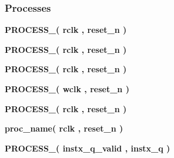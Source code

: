 \subsubsection*{Processes}
 \begin{DoxyCompactItemize}
\item 
{\bf P\+R\+O\+C\+E\+S\+S\+\_}{\bfseries  ( {\bfseries {\bfseries {\bf rclk}} \textcolor{vhdlchar}{ }} , {\bfseries {\bfseries {\bf reset\+\_\+n}} \textcolor{vhdlchar}{ }} )}
\item 
{\bf P\+R\+O\+C\+E\+S\+S\+\_}{\bfseries  ( {\bfseries {\bfseries {\bf rclk}} \textcolor{vhdlchar}{ }} , {\bfseries {\bfseries {\bf reset\+\_\+n}} \textcolor{vhdlchar}{ }} )}
\item 
{\bf P\+R\+O\+C\+E\+S\+S\+\_}{\bfseries  ( {\bfseries {\bfseries {\bf rclk}} \textcolor{vhdlchar}{ }} , {\bfseries {\bfseries {\bf reset\+\_\+n}} \textcolor{vhdlchar}{ }} )}
\item 
{\bf P\+R\+O\+C\+E\+S\+S\+\_}{\bfseries  ( {\bfseries {\bfseries {\bf wclk}} \textcolor{vhdlchar}{ }} , {\bfseries {\bfseries {\bf reset\+\_\+n}} \textcolor{vhdlchar}{ }} )}
\item 
{\bf P\+R\+O\+C\+E\+S\+S\+\_}{\bfseries  ( {\bfseries {\bfseries {\bf rclk}} \textcolor{vhdlchar}{ }} , {\bfseries {\bfseries {\bf reset\+\_\+n}} \textcolor{vhdlchar}{ }} )}
\item 
{\bf proc\+\_\+name}{\bfseries  ( {\bfseries {\bfseries {\bf rclk}} \textcolor{vhdlchar}{ }} , {\bfseries {\bfseries {\bf reset\+\_\+n}} \textcolor{vhdlchar}{ }} )}
\item 
{\bf P\+R\+O\+C\+E\+S\+S\+\_}{\bfseries  ( {\bfseries {\bfseries {\bf instx\+\_\+q\+\_\+valid}} \textcolor{vhdlchar}{ }} , {\bfseries {\bfseries {\bf instx\+\_\+q}} \textcolor{vhdlchar}{ }} )}
\end{DoxyCompactItemize}

